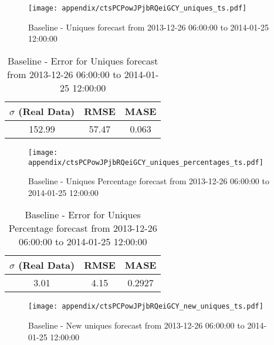 \begin{figure}[H] \begin{center} \leavevmode
\texttt{[image: appendix/ctsPCPowJPjbRQeiGCY\_uniques\_ts.pdf]} \caption{
Baseline - Uniques forecast from 2013-12-26 06:00:00 to 2014-01-25 12:00:00} \label{fig:appendix/ctsPCPowJPjbRQeiGCY_uniques_ts.pdf} \end{center}
\end{figure}

\begin{table}[H]
\centering
\footnotesize
\begin{tabular}{ccc}
$\sigma$ (Real Data) & RMSE & MASE   \\ \hline
152.99 & 57.47 & 0.063 \\
\end{tabular}

\vspace{0.5cm}

\caption{
Baseline - Error for Uniques forecast from 2013-12-26 06:00:00 to 2014-01-25 12:00:00}
\end{table}

\begin{figure}[H] \begin{center} \leavevmode
\texttt{[image: appendix/ctsPCPowJPjbRQeiGCY\_uniques\_percentages\_ts.pdf]} \caption{
Baseline - Uniques Percentage forecast from 2013-12-26 06:00:00 to 2014-01-25 12:00:00} \label{fig:appendix/ctsPCPowJPjbRQeiGCY_uniques_percentages_ts.pdf} \end{center}
\end{figure}

\begin{table}[H]
\centering
\footnotesize
\begin{tabular}{ccc}
$\sigma$ (Real Data) & RMSE & MASE   \\ \hline
3.01 & 4.15 & 0.2927 \\
\end{tabular}

\vspace{0.5cm}

\caption{
Baseline - Error for Uniques Percentage forecast from 2013-12-26 06:00:00 to 2014-01-25 12:00:00}
\end{table}

\begin{figure}[H] \begin{center} \leavevmode
\texttt{[image: appendix/ctsPCPowJPjbRQeiGCY\_new\_uniques\_ts.pdf]} \caption{
Baseline - New uniques forecast from 2013-12-26 06:00:00 to 2014-01-25 12:00:00} \label{fig:appendix/ctsPCPowJPjbRQeiGCY_new_uniques_ts.pdf} \end{center}
\end{figure}

